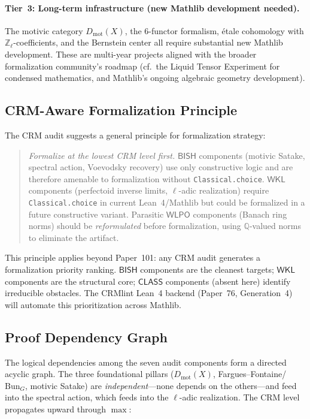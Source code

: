 \documentclass[11pt,a4paper]{article}
\theoremstyle{plain}
\theoremstyle{definition}
\newcommand{\BISH}{\textsf{BISH}}
\newcommand{\WKL}{\textsf{WKL}}
\newcommand{\WLPO}{\textsf{WLPO}}
\newcommand{\CLASS}{\textsf{CLASS}}
\newcommand{\Dmot}{D_{\mathrm{mot}}}
\newcommand{\Bun}{\mathrm{Bun}}
\newcommand{\Z}{\mathbb{Z}}
\newcommand{\Q}{\mathbb{Q}}
\begin{document}
\paragraph{Tier~3: Long-term infrastructure (new Mathlib development needed).}
The motivic category $\Dmot(X)$, the 6-functor formalism, \'etale cohomology with $\Z_\ell$-coefficients, and the Bernstein center all require substantial new Mathlib development. These are multi-year projects aligned with the broader formalization community's roadmap (cf.\ the Liquid Tensor Experiment for condensed mathematics, and Mathlib's ongoing algebraic geometry development).

\subsection{CRM-Aware Formalization Principle}

The CRM audit suggests a general principle for formalization strategy:

\begin{quote}
\emph{Formalize at the lowest CRM level first.} $\BISH$ components (motivic Satake, spectral action, Voevodsky recovery) use only constructive logic and are therefore amenable to formalization without \texttt{Classical.choice}. $\WKL$ components (perfectoid inverse limits, $\ell$-adic realization) require \texttt{Classical.choice} in current Lean~4/Mathlib but could be formalized in a future constructive variant. Parasitic $\WLPO$ components (Banach ring norms) should be \emph{reformulated} before formalization, using $\Q$-valued norms to eliminate the artifact.
\end{quote}

This principle applies beyond Paper~101: any CRM audit generates a formalization priority ranking. $\BISH$ components are the cleanest targets; $\WKL$ components are the structural core; $\CLASS$ components (absent here) identify irreducible obstacles. The CRMlint Lean~4 backend (Paper~76, Generation~4) will automate this prioritization across Mathlib.

\subsection{Proof Dependency Graph}

The logical dependencies among the seven audit components form a directed acyclic graph.  The three foundational pillars ($\Dmot(X)$, Fargues--Fontaine/$\Bun_G$, motivic Satake) are \emph{independent}---none depends on the others---and feed into the spectral action, which feeds into the $\ell$-adic realization.  The CRM level propagates upward through $\max$:
\end{document}
